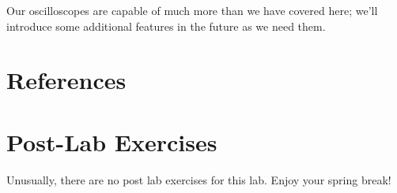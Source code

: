 \documentclass[12pt]{article}
\begin{document}
Our oscilloscopes are capable of much more than we have covered here;
we'll introduce some additional features in the future as we need
them. 

\section{References}
\label{sec:references}

  \newpage

  \section*{Post-Lab Exercises}

  Unusually, there are no post lab exercises for this lab.  Enjoy your
  spring break!
\end{document}
